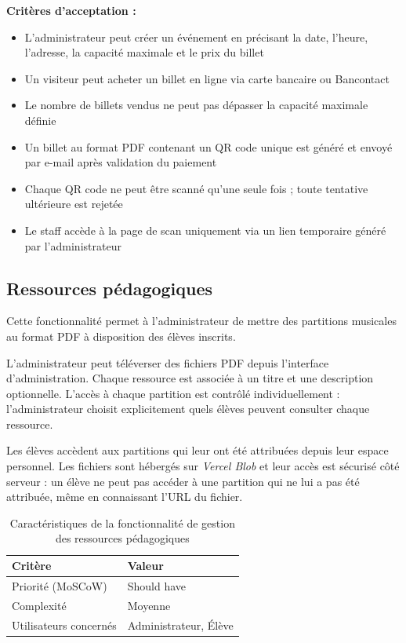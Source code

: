 \documentclass{article}
\begin{document}
\textbf{Critères d'acceptation :}
\begin{itemize}
    \item L'administrateur peut créer un événement en précisant 
    la date, l'heure, l'adresse, la capacité maximale et le 
    prix du billet
    \item Un visiteur peut acheter un billet en ligne via 
    carte bancaire ou Bancontact
    \item Le nombre de billets vendus ne peut pas dépasser 
    la capacité maximale définie
    \item Un billet au format PDF contenant un QR code unique 
    est généré et envoyé par e-mail après validation du paiement
    \item Chaque QR code ne peut être scanné qu'une seule fois ; 
    toute tentative ultérieure est rejetée
    \item Le staff accède à la page de scan uniquement via
    un lien temporaire généré par l'administrateur
\end{itemize}

\subsection{Ressources pédagogiques}

Cette fonctionnalité permet à l'administrateur de mettre des
partitions musicales au format PDF à disposition des élèves
inscrits.

L'administrateur peut téléverser des fichiers PDF depuis l'interface
d'administration. Chaque ressource est associée à un titre et une
description optionnelle. L'accès à chaque partition est contrôlé
individuellement : l'administrateur choisit explicitement quels
élèves peuvent consulter chaque ressource.

Les élèves accèdent aux partitions qui leur ont été attribuées
depuis leur espace personnel. Les fichiers sont hébergés sur
\textit{Vercel Blob} et leur accès est sécurisé côté serveur :
un élève ne peut pas accéder à une partition qui ne lui a pas été
attribuée, même en connaissant l'URL du fichier.

\begin{table}[H]
\centering
\begin{tabular}{|p{5cm}|p{7cm}|}
\hline
\textbf{Critère} & \textbf{Valeur} \\
\hline
Priorité (MoSCoW) & Should have \\
\hline
Complexité & Moyenne \\
\hline
Utilisateurs concernés & Administrateur, Élève \\
\hline
\end{tabular}
\caption{Caractéristiques de la fonctionnalité de gestion des ressources pédagogiques}
\end{table}
\end{document}
